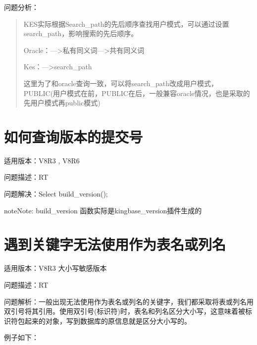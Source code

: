 \documentclass[letterpaper,10pt,english]{sphinxmanual}
\begin{document}
问题分析：
\begin{quote}

KES实际根据Search\_path的先后顺序查找用户模式，可以通过设置search\_path，影响搜索的先后顺序。

Oracle：—>私有同义词—>共有同义词

Kes：—>search\_path

这里为了和oracle查询一致，可以将search\_path改成用户模式，PUBLIC(用户模式在前，PUBLIC在后，一般兼容oracle情况，也是采取的先用户模式再public模式)
\end{quote}


\section{如何查询版本的提交号}
\label{\detokenize{sql:id11}}
适用版本：V8R3 , V8R6

问题描述：RT

问题解决：Select build\_version();

\begin{sphinxadmonition}{note}{Note:}
build\_version 函数实际是kingbase\_version插件生成的
\end{sphinxadmonition}


\section{遇到关键字无法使用作为表名或列名}
\label{\detokenize{sql:id12}}
适用版本：V8R3 大小写敏感版本

问题描述：RT

问题解析：一般出现无法使用作为表名或列名的关键字，我们都采取将表或列名用双引号将其引用。使用双引号(标识符)时，表名和列名区分大小写，这意味着被标识符包起来的对象，写到数据库的原信息就是区分大小写的。

例子如下：
\end{document}
